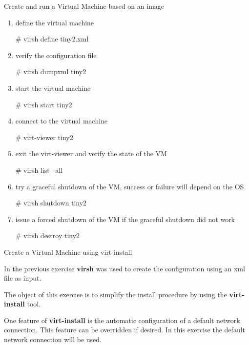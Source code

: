 \begin{Lab}
\begin{exe} {Create and run a Virtual Machine based on an image}
\begin{sol}
\begin{enumerate}
		\textbf{Note:} There are two sample files one 
			for \textbf{Ubuntu} called 
			and for \textbf{CentOS} called 
			, the difference is the 
			name of the \textbf{emulator} in the file, please 
			select the correct example file for your lab environment. 
		\item define the virtual machine 
			\begin{raw}
# virsh define tiny2.xml
			\end{raw}
		\item verify the configuration file 
			\begin{raw}
# virsh dumpxml tiny2 
			\end{raw}
		\item start the virtual machine 
			\begin{raw}
# virsh start tiny2
			\end{raw}
		\item connect to the virtual machine
			\begin{raw}
# virt-viewer tiny2 
			\end{raw}
		\item exit the virt-viewer and verify the state of the VM
			\begin{raw}
# virsh list --all 
			\end{raw}
		\item try a graceful shutdown of the VM, success or failure will depend on the OS
			\begin{raw}
# virsh shutdown tiny2 
			\end{raw}
		\item issue a forced shutdown of the VM if the graceful shutdown did not work
			\begin{raw}
# virsh destroy tiny2 
			\end{raw} 
		\end{enumerate}

	\end{sol}
\end{exe}

\begin{exe}  {Create a Virtual Machine using virt-install}

	
	In the previous exercise \textbf{virsh} 
	was used to create the configuration using an xml file as input.


	The object of this exercise is to simplify the install procedure 
	by using the \textbf{virt-install} tool. 

	One feature of \textbf{virt-install} is the 
	automatic configuration of a default network connection. 
	This feature can be overridden if desired. In this exercise the default 
	network connection will be used. 


\end{exe}
\end{Lab}
